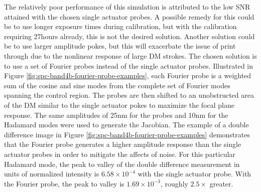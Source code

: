 \documentclass[12pt]{spieman}  %
\begin{document}
\begin{spacing}{2}
The relatively poor performance of this simulation is attributed to the low SNR attained with the chosen single actuator probes. A possible remedy for this could be to use longer exposure times during calibration, but with the calibration requiring 27hours already, this is not the desired solution. Another solution could be to use larger amplitude pokes, but this will exacerbate the issue of print through due to the nonlinear response of large DM strokes. The chosen solution is to use a set of Fourier probes instead of the single actuator probes. Illustrated in Figure \ref{fig:spc-band4b-fourier-probe-examples}, each Fourier probe is a weighted sum of the cosine and sine modes from the complete set of Fourier modes spanning the control region. The probes are then shifted to an unobstructed area of the DM similar to the single actuator pokes to maximize the focal plane response. The same amplitudes of 25nm for the probes and 10nm for the Hadamard modes were used to generate the Jacobian. The example of a double difference image in Figure \ref{fig:spc-band4b-fourier-probe-examples} demonstrates that the Fourier probe generates a higher amplitude response than the single actuator probes in order to mitigate the affects of noise. For this particular Hadamard mode, the peak to valley of the double difference measurement in units of normalized intensity is $6.58\times10^{-4}$ with the single actuator probe. With the Fourier probe, the peak to valley is $1.69\times10^{-3}$, roughly $2.5\times$ greater. 


\end{spacing}
\end{document}

